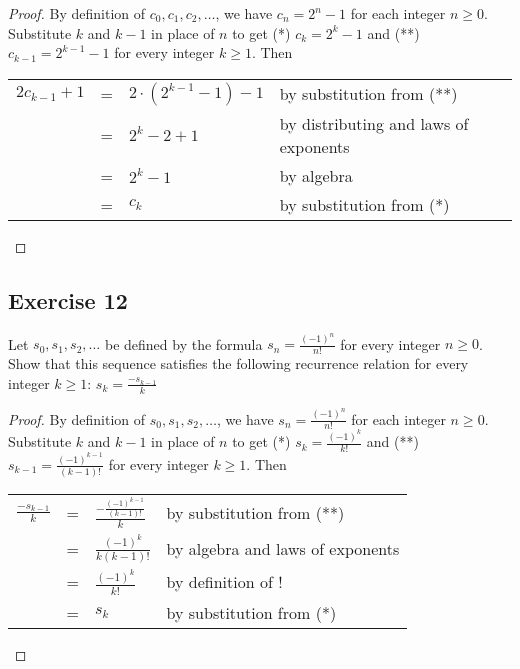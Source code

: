 \documentclass[14pt]{extarticle}
\newcommand{\dps}{\displaystyle}
\newcommand{\cy}{\color{cyan}}
\begin{document}
\begin{proof}
    By definition of $c_0, c_1, c_2, \ldots$, we have $c_n = 2^n-1$ for each integer $n \geq 0$. Substitute $k$ and
    $k-1$ in place of $n$ to get (*) $c_k = 2^k - 1$ and (**) $c_{k-1} = 2^{k - 1} - 1$ for every integer $k \geq 1$. Then

    \begin{tabular}{lcll}
        $2c_{k - 1} + 1$ & = & $2 \cdot (2^{k - 1} - 1) - 1$ & {\cy by substitution from (**)}             \\
                         & = & $2^k - 2 + 1$                 & {\cy by distributing and laws of exponents} \\
                         & = & $2^k - 1$                     & {\cy by algebra}                            \\
                         & = & $c_k$                         & {\cy by substitution from (*)}              \\
    \end{tabular}
\end{proof}

\subsection{Exercise 12}
Let $s_0, s_1, s_2, \ldots$ be defined by the formula $s_n = \dps \frac{(-1)^n}{n!}$ for every integer $n \geq 0$.
Show that this sequence satisfies the following recurrence relation for every integer $k \geq 1$:
\(\dps s_k = \frac{-s_{k - 1}}{k}\)

\begin{proof}
    By definition of $s_0, s_1, s_2, \ldots$, we have $s_n = \frac{(-1)^n}{n!}$ for each integer $n \geq 0$. Substitute
    $k$ and $k-1$ in place of $n$ to get (*) $s_k = \frac{(-1)^k}{k!}$ and
    (**) $s_{k-1} = \frac{(-1)^{k-1}}{(k-1)!}$ for every integer $k \geq 1$. Then

    \begin{tabular}{lcll}
        $\dps \frac{-s_{k - 1}}{k}$ & = & $\dps \frac{-\frac{(-1)^{k-1}}{(k-1)!}}{k}$ & {\cy by substitution from (**)}        \\
                                    & = & $\dps \frac{(-1)^{k}}{k(k-1)!}$             & {\cy by algebra and laws of exponents} \\
                                    & = & $\dps \frac{(-1)^{k}}{k!}$                  & {\cy by definition of !}               \\
                                    & = & $s_k$                                       & {\cy by substitution from (*)}         \\
    \end{tabular}
\end{proof}
\end{document}
